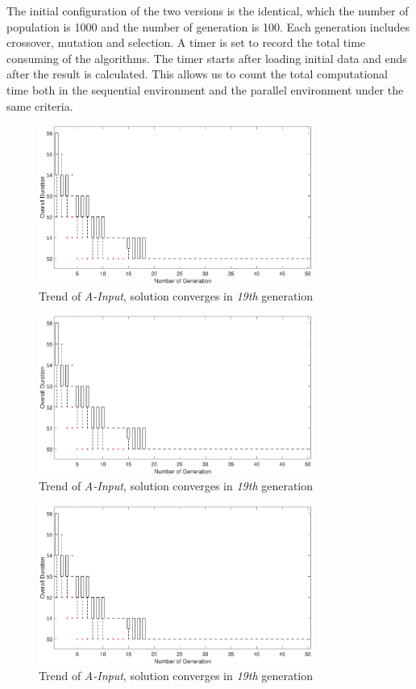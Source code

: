 The initial configuration of the two versions is the identical, which the number
of population is 1000 and the number of generation is 100. Each generation
includes crossover, mutation and selection. A timer is set to record the total
time consuming of the algorithms. The timer starts after loading initial data
and ends after the result is calculated. This allows us to count the total
computational time both in the sequential environment and the parallel
environment under the same criteria.

\begin{figure}[!htb]
  \centering
  \includegraphics[width=0.8\textwidth]{figures/fig_pa1.eps}
  \caption{Trend of \emph{A-Input}, solution converges in \emph{19th} generation}
  \label{fig:pa1c}
\end{figure}

\begin{figure}[!htb]
  \centering
  \includegraphics[width=0.8\textwidth]{figures/fig_pa1.eps}
  \caption{Trend of \emph{A-Input}, solution converges in \emph{19th} generation}
  \label{fig:pa2c}
\end{figure}

\begin{figure}[!htb]
  \centering
  \includegraphics[width=0.8\textwidth]{figures/fig_pa1.eps}
  \caption{Trend of \emph{A-Input}, solution converges in \emph{19th} generation}
  \label{fig:pa3c}
\end{figure}

